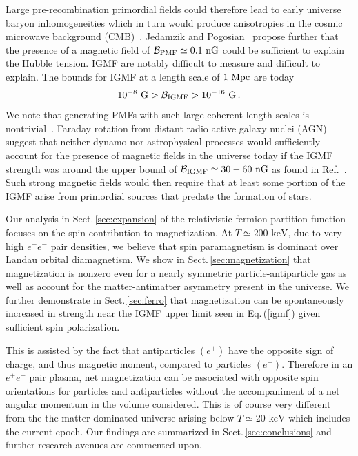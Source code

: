 \documentclass[reprint]{revtex4-2}
\newcommand*{\keV}{\text{ keV}}
\newcommand{\req}[1]{Eq.\,(\ref{#1})}
\newcommand{\rsec}[1]{Sect.\,{\ref{#1}}}
\begin{document}
Large pre-recombination primordial fields could therefore lead to early universe baryon inhomogeneities which in turn would produce anisotropies in the cosmic microwave background (CMB)~\cite{jedamzik2013smallscale,abdalla2022cosmology}. Jedamzik and Pogosian~\cite{jedamzik2020relieving} propose further that the presence of a magnetic field of ${\cal B}_{\rm PMF}\simeq0.1{\rm\ nG}$ could be sufficient to explain the Hubble tension.  IGMF are notably difficult to measure and difficult to explain. The bounds for IGMF at a length scale of $1{\rm\ Mpc}$ are today~\cite{neronov2010evidence,taylor2011extragalactic,pshirkov2015new,jedamzik2019stringent,vernstrom2021discovery}
\begin{align}
    \label{igmf}
    10^{-8}{\rm\ G}>\mathcal{B}_{\rm IGMF}>10^{-16}{\rm\ G}\,.
\end{align}
We note that generating PMFs with such large coherent length scales is nontrivial~\cite{giovannini2023scaling}. Faraday rotation from distant radio active galaxy nuclei (AGN)~\cite{pomakov2022redshift} suggest that neither dynamo nor astrophysical processes would sufficiently account for the presence of magnetic fields in the universe today if the IGMF strength was around the upper bound of ${\cal B}_{\rm IGMF}\simeq30-60{\rm\ nG}$ as found in Ref.~\cite{vernstrom2021discovery}. Such strong magnetic fields would then require that at least some portion of the IGMF arise from primordial sources that predate the formation of stars.

Our analysis in \rsec{sec:expansion} of the relativistic fermion partition function focuses on the spin contribution to magnetization. At $T\simeq200\keV$, due to very high $e^{+}e^{-}$ pair densities, we believe that spin paramagnetism is dominant over Landau orbital diamagnetism. We show in \rsec{sec:magnetization} that magnetization is nonzero even for a nearly symmetric particle-antiparticle gas as well as account for the matter-antimatter asymmetry present in the universe. We further demonstrate in \rsec{sec:ferro} that magnetization can be spontaneously increased in strength near the IGMF upper limit seen in \req{igmf} given sufficient spin polarization.

This is assisted by the fact that antiparticles $(e^{+})$ have the opposite sign of charge, and thus magnetic moment, compared to particles  $(e^{-})$. Therefore in an $e^{+}e^{-}$ pair plasma, net magnetization can be associated with opposite spin orientations for particles and antiparticles without the accompaniment of a net angular momentum in the volume considered. This is of course very different from the the matter dominated universe arising below $T\simeq20\keV$ which includes the current epoch. Our findings are summarized in \rsec{sec:conclusions} and further research avenues are commented upon.
\end{document}
